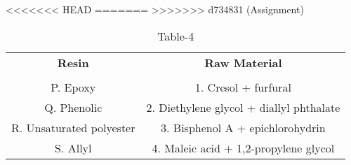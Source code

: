 \begin{table}[htbp]
  \centering
  \caption{Table-4}
<<<<<<< HEAD
  \label{tab:tables/table4.tex}
=======
  \label{table4}
>>>>>>> d734831 (Assignment)
  \begin{tabular}{cc}
  \textbf{Resin} & \textbf{Raw Material} \\ \\
    P. Epoxy & 1. Cresol + furfural \\
    Q. Phenolic & 2. Diethylene glycol + diallyl phthalate \\
    R. Unsaturated polyester & 3. Bisphenol A + epichlorohydrin \\
    S. Allyl & 4. Maleic acid + 1,2-propylene glycol \\
  \end{tabular}
\end{table}